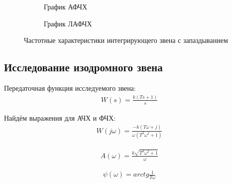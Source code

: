\documentclass[a4paper, 11pt]{article}
\begin{document}
\begin{figure}[h!]
    \begin{subfigure}{0.5\textwidth}
        \centering
        \caption{График АФЧХ}
    \end{subfigure}
    \begin{subfigure}{0.5\textwidth}
        \centering
        \caption{График ЛАФЧХ}
    \end{subfigure}
    \caption{Частотные характеристики интегрирующего звена с запаздыванием}
\end{figure}

\newpage
\begin{center}
	\section{Исследование изодромного звена}
\end{center}

\par 
Передаточная функция исследуемого звена:
\begin{align}
	W(s)=\frac{k(Ts + 1)}{s}
\end{align}
\par 
Найдём выражения для АЧХ и ФЧХ:
\begin{align}
	W(j\omega)=\frac{-k(T\omega+j)}{\omega(T^2\omega^2+1)}
\end{align}

\begin{align}
	A(\omega)=\frac{k\sqrt{T^2\omega^2+1}}{\omega}
\end{align}

\begin{align}
	\psi(\omega)=arctg\frac{1}{T\omega}
\end{align}
\end{document}
